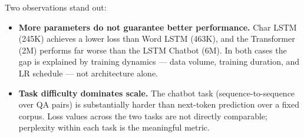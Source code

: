 Two observations stand out:

\begin{itemize}
    \item \textbf{More parameters do not guarantee better performance.} Char LSTM
    (245K) achieves a lower loss than Word LSTM (463K), and the Transformer (2M)
    performs far worse than the LSTM Chatbot (6M). In both cases the gap is
    explained by training dynamics — data volume, training duration, and LR
    schedule — not architecture alone.

    \item \textbf{Task difficulty dominates scale.} The chatbot task
    (sequence-to-sequence over QA pairs) is substantially harder than next-token
    prediction over a fixed corpus. Loss values across the two tasks are not
    directly comparable; perplexity within each task is the meaningful metric.
\end{itemize}
